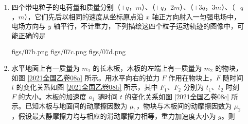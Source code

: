 \documentclass[\gkver]{gaokaozhenti}
\begin{document}
\begin{enumerate}
{	A．在此过程中，外力 $F$ 做功为 $W=Fs_{0}=\frac{3}{4}mv_{0}^{2}$，故 A 错误；

	B．由平均速度公式可知，外力 $F$ 作用时间 $t_{1}=\frac{s_{0}}{\frac{0+v_{0}}{2}}=\frac{2s_{0}}{v_{0}}$，在此过程中，$F$ 的冲量大小是 $I=Ft_{1}=\frac{3}{2}mv_{0}$，故 B 正确。

	故选 BC。
}

\item
四个带电粒子的电荷量和质量分别（$+q$，$m$）、（$+q$，$2m$）、（$+3q$，$3m$）、（$-q$，$m$），它们先后以相同的速度从坐标原点沿 $x$ 轴正方向射入一匀强电场中，电场方向与 $y$ 轴平行，不计重力，下列描绘这四个粒子运动轨迹的图像中，可能正确的是 

{figs/07b.png}
{figs/07c.png}
{figs/07d.png}


\item
水平地面上有一质量为 $m_{1}$ 的长木板，木板的左端上有一质量为 $m_{2}$ 的物块，如图 \ref{2021全国乙卷08a} 所示。用水平向右的拉力 $F$ 作用在物块上，$F$ 随时间 $t$ 的变化关系如图 \ref{2021全国乙卷08b} 所示，其中 $F_{1}$、$F_{2}$ 分别为 $t_{1}$、$t_{2}$ 时刻 $F$ 的大小。木板的加速度 $a_{1}$ 随时间 $t$ 的变化关系如图 \ref{2021全国乙卷08c} 所示。已知木板与地面间的动摩擦因数为 $\mu_{1}$，物块与木板间的动摩擦因数为 $\mu_{2}$，假设最大静摩擦力均与相应的滑动摩擦力相等，重力加速度大小为 $g$。则 


\end{enumerate}
\end{document}
